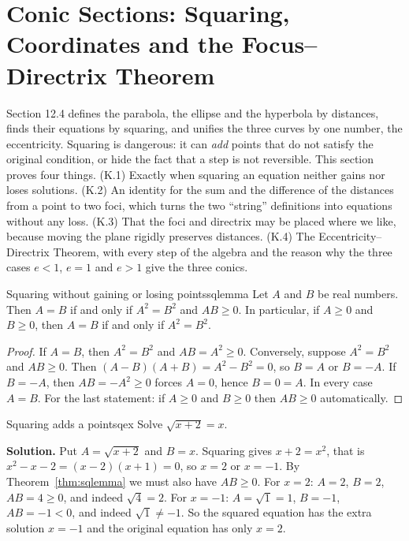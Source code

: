 \documentclass[11pt]{article}
\begin{document}
\section{Conic Sections: Squaring, Coordinates and the Focus--Directrix Theorem}

Section 12.4 defines the parabola, the ellipse and the hyperbola by distances, finds their equations by squaring, and unifies the three curves by one number, the eccentricity. Squaring is dangerous: it can \emph{add} points that do not satisfy the original condition, or hide the fact that a step is not reversible. This section proves four things. (K.1) Exactly when squaring an equation neither gains nor loses solutions. (K.2) An identity for the sum and the difference of the distances from a point to two foci, which turns the two ``string'' definitions into equations without any loss. (K.3) That the foci and directrix may be placed where we like, because moving the plane rigidly preserves distances. (K.4) The Eccentricity--Directrix Theorem, with every step of the algebra and the reason why the three cases $e<1$, $e=1$ and $e>1$ give the three conics.

\begin{thm}{Squaring without gaining or losing points}{sqlemma}
Let $A$ and $B$ be real numbers. Then $A=B$ if and only if $A^2=B^2$ and $AB\ge0$. In particular, if $A\ge0$ and $B\ge0$, then $A=B$ if and only if $A^2=B^2$.
\end{thm}
\begin{proof}
If $A=B$, then $A^2=B^2$ and $AB=A^2\ge0$. Conversely, suppose $A^2=B^2$ and $AB\ge0$. Then $(A-B)(A+B)=A^2-B^2=0$, so $B=A$ or $B=-A$. If $B=-A$, then $AB=-A^2\ge0$ forces $A=0$, hence $B=0=A$. In every case $A=B$. For the last statement: if $A\ge0$ and $B\ge0$ then $AB\ge0$ automatically.
\end{proof}

\begin{exmp}{Squaring adds a point}{sqex}
Solve $\sqrt{x+2}=x$. 

\textbf{Solution.} Put $A=\sqrt{x+2}$ and $B=x$. Squaring gives $x+2=x^2$, that is $x^2-x-2=(x-2)(x+1)=0$, so $x=2$ or $x=-1$. By Theorem~\ref{thm:sqlemma} we must also have $AB\ge0$. For $x=2$: $A=2$, $B=2$, $AB=4\ge0$, and indeed $\sqrt4=2$. For $x=-1$: $A=\sqrt1=1$, $B=-1$, $AB=-1<0$, and indeed $\sqrt1\ne-1$. So the squared equation has the extra solution $x=-1$ and the original equation has only $x=2$.
\end{exmp}
\end{document}
